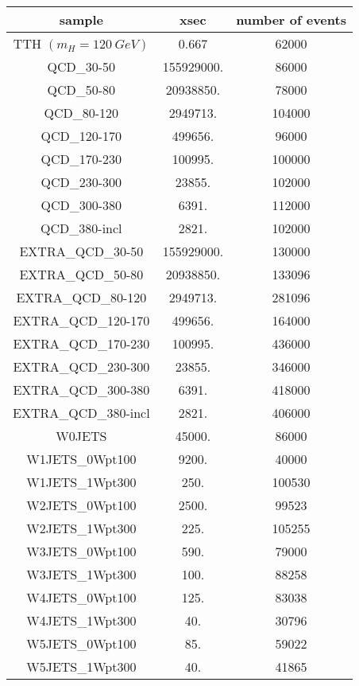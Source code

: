 \documentclass[12pt,a4paper,twoside,english]{report}
\begin{document}
\begin{table}[h!]
  \center
  \begin{tabular}{||c|c|c||}
    \hline
    \hline
    sample & xsec & number of events\\
    \hline
    TTH $(m_H=120\ GeV)$ & 0.667 & 62000\\
    \hline
    QCD\_30-50    & 155929000. &  86000\\
    QCD\_50-80    &  20938850. &  78000\\
    QCD\_80-120   &   2949713. & 104000\\ 
    QCD\_120-170  &    499656. &  96000\\
    QCD\_170-230  &    100995. & 100000\\
    QCD\_230-300  &     23855. & 102000\\
    QCD\_300-380  &      6391. & 112000\\
    QCD\_380-incl &      2821. & 102000\\
    \hline
    EXTRA\_QCD\_30-50    & 155929000. & 130000\\
    EXTRA\_QCD\_50-80    &  20938850. & 133096\\
    EXTRA\_QCD\_80-120   &   2949713. & 281096\\ 
    EXTRA\_QCD\_120-170  &    499656. & 164000\\
    EXTRA\_QCD\_170-230  &    100995. & 436000\\
    EXTRA\_QCD\_230-300  &     23855. & 346000\\
    EXTRA\_QCD\_300-380  &      6391. & 418000\\
    EXTRA\_QCD\_380-incl &      2821. & 406000\\
    \hline
    W0JETS          & 45000. &  86000\\
    W1JETS\_0Wpt100 &  9200. &  40000\\
    W1JETS\_1Wpt300 &   250. & 100530\\
    W2JETS\_0Wpt100 &  2500. &  99523\\
    W2JETS\_1Wpt300 &   225. & 105255\\
    W3JETS\_0Wpt100 &   590. &  79000\\
    W3JETS\_1Wpt300 &   100. &  88258\\
    W4JETS\_0Wpt100 &   125. &  83038\\
    W4JETS\_1Wpt300 &    40. &  30796\\
    W5JETS\_0Wpt100 &    85. &  59022\\
    W5JETS\_1Wpt300 &    40. &  41865\\

\end{tabular}
\end{table}
\end{document}
